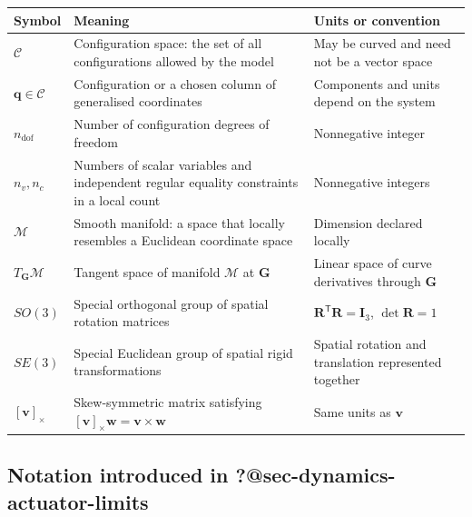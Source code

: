 \documentclass[
  australian,
  12pt,
  letterpaper,
  DIV=11,
  numbers=noendperiod,
  twoside]{scrreprt}
\newcounter{none} %
\begin{document}
{\def\LTcaptype{none} %
\begin{longtable}[]{@{}
  >{\raggedright\arraybackslash}p{}
  >{\raggedright\arraybackslash}p{}
  >{\raggedright\arraybackslash}p{}@{}}
\toprule\noalign{}
\begin{minipage}[b]{\linewidth}\raggedright
Symbol
\end{minipage} & \begin{minipage}[b]{\linewidth}\raggedright
Meaning
\end{minipage} & \begin{minipage}[b]{\linewidth}\raggedright
Units or convention
\end{minipage} \\
\midrule\noalign{}
\endhead
\bottomrule\noalign{}
\endlastfoot
\(\mathcal C\) & Configuration space: the set of all configurations
allowed by the model & May be curved and need not be a vector space \\
\(\mathbf q\in\mathcal C\) & Configuration or a chosen column of
generalised coordinates & Components and units depend on the system \\
\(n_{\mathrm{dof}}\) & Number of configuration degrees of freedom &
Nonnegative integer \\
\(n_v,n_c\) & Numbers of scalar variables and independent regular
equality constraints in a local count & Nonnegative integers \\
\(\mathcal M\) & Smooth manifold: a space that locally resembles a
Euclidean coordinate space & Dimension declared locally \\
\(T_{\mathbf G}\mathcal M\) & Tangent space of manifold \(\mathcal M\)
at \(\mathbf G\) & Linear space of curve derivatives through
\(\mathbf G\) \\
\(SO(3)\) & Special orthogonal group of spatial rotation matrices &
\(\mathbf R^\mathsf T\mathbf R=\mathbf I_3\), \(\det\mathbf R=1\) \\
\(SE(3)\) & Special Euclidean group of spatial rigid transformations &
Spatial rotation and translation represented together \\
\([\mathbf{v}]_\times\) & Skew-symmetric matrix satisfying
\([\mathbf{v}]_\times\mathbf{w}=\mathbf{v}\times\mathbf{w}\) & Same
units as \(\mathbf{v}\) \\
\end{longtable}
}

\subsection*{\texorpdfstring{Notation introduced in
\textbf{?@sec-dynamics-actuator-limits}}{Notation introduced in ?@sec-dynamics-actuator-limits}}\label{notation-introduced-in-sec-dynamics-actuator-limits}
\end{document}

